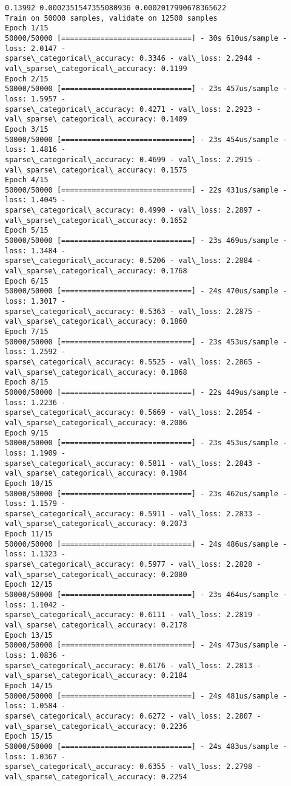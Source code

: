\documentclass[11pt]{article}
\begin{document}
    \begin{Verbatim}[commandchars=\\\{\}]
0.13992 0.0002351547355080936 0.0002017990678365622
Train on 50000 samples, validate on 12500 samples
Epoch 1/15
50000/50000 [==============================] - 30s 610us/sample - loss: 2.0147 -
sparse\_categorical\_accuracy: 0.3346 - val\_loss: 2.2944 -
val\_sparse\_categorical\_accuracy: 0.1199
Epoch 2/15
50000/50000 [==============================] - 23s 457us/sample - loss: 1.5957 -
sparse\_categorical\_accuracy: 0.4271 - val\_loss: 2.2923 -
val\_sparse\_categorical\_accuracy: 0.1409
Epoch 3/15
50000/50000 [==============================] - 23s 454us/sample - loss: 1.4816 -
sparse\_categorical\_accuracy: 0.4699 - val\_loss: 2.2915 -
val\_sparse\_categorical\_accuracy: 0.1575
Epoch 4/15
50000/50000 [==============================] - 22s 431us/sample - loss: 1.4045 -
sparse\_categorical\_accuracy: 0.4990 - val\_loss: 2.2897 -
val\_sparse\_categorical\_accuracy: 0.1652
Epoch 5/15
50000/50000 [==============================] - 23s 469us/sample - loss: 1.3484 -
sparse\_categorical\_accuracy: 0.5206 - val\_loss: 2.2884 -
val\_sparse\_categorical\_accuracy: 0.1768
Epoch 6/15
50000/50000 [==============================] - 24s 470us/sample - loss: 1.3017 -
sparse\_categorical\_accuracy: 0.5363 - val\_loss: 2.2875 -
val\_sparse\_categorical\_accuracy: 0.1860
Epoch 7/15
50000/50000 [==============================] - 23s 453us/sample - loss: 1.2592 -
sparse\_categorical\_accuracy: 0.5525 - val\_loss: 2.2865 -
val\_sparse\_categorical\_accuracy: 0.1868
Epoch 8/15
50000/50000 [==============================] - 22s 449us/sample - loss: 1.2236 -
sparse\_categorical\_accuracy: 0.5669 - val\_loss: 2.2854 -
val\_sparse\_categorical\_accuracy: 0.2006
Epoch 9/15
50000/50000 [==============================] - 23s 453us/sample - loss: 1.1909 -
sparse\_categorical\_accuracy: 0.5811 - val\_loss: 2.2843 -
val\_sparse\_categorical\_accuracy: 0.1984
Epoch 10/15
50000/50000 [==============================] - 23s 462us/sample - loss: 1.1579 -
sparse\_categorical\_accuracy: 0.5911 - val\_loss: 2.2833 -
val\_sparse\_categorical\_accuracy: 0.2073
Epoch 11/15
50000/50000 [==============================] - 24s 486us/sample - loss: 1.1323 -
sparse\_categorical\_accuracy: 0.5977 - val\_loss: 2.2828 -
val\_sparse\_categorical\_accuracy: 0.2080
Epoch 12/15
50000/50000 [==============================] - 23s 464us/sample - loss: 1.1042 -
sparse\_categorical\_accuracy: 0.6111 - val\_loss: 2.2819 -
val\_sparse\_categorical\_accuracy: 0.2178
Epoch 13/15
50000/50000 [==============================] - 24s 473us/sample - loss: 1.0836 -
sparse\_categorical\_accuracy: 0.6176 - val\_loss: 2.2813 -
val\_sparse\_categorical\_accuracy: 0.2184
Epoch 14/15
50000/50000 [==============================] - 24s 481us/sample - loss: 1.0584 -
sparse\_categorical\_accuracy: 0.6272 - val\_loss: 2.2807 -
val\_sparse\_categorical\_accuracy: 0.2236
Epoch 15/15
50000/50000 [==============================] - 24s 483us/sample - loss: 1.0367 -
sparse\_categorical\_accuracy: 0.6355 - val\_loss: 2.2798 -
val\_sparse\_categorical\_accuracy: 0.2254
    \end{Verbatim}
\end{document}
